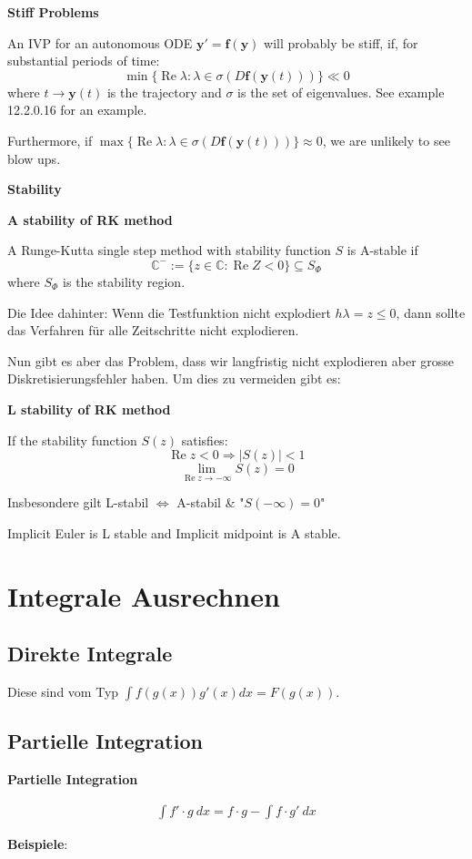 \documentclass{sciposter}
\renewcommand{\vec}[1]{\mathbf{#1}}
\newenvironment{method}[1]{\begin{mdframed}[backgroundcolor=blue!10,innertopmargin=15pt, innerbottommargin=15pt, nobreak=true]
		\textbf{#1 }
	}
	{ 
	\end{mdframed}
}
\newcommand{\psection}[1]{\par \textbf{\large#1}}
\begin{document}
\begin{multicols}{2}
\begin{method}{Stiff Problems}
	An IVP for an autonomous ODE $\vec{y'} = \vec{f}(\vec{y})$ will probably be stiff, if, for substantial periods of time:
	$$\min\{\operatorname{Re} \lambda : \lambda \in \sigma (D\vec{f}(\vec{y}(t)))\} \ll 0$$
	where $t\to \vec{y}(t)$ is the trajectory and $\sigma$ is the set of eigenvalues. See example 12.2.0.16 for an example.
	
	Furthermore, if $\max\{\operatorname{Re} \lambda : \lambda \in \sigma (D\vec{f}(\vec{y}(t)))\} \approx 0$, we are unlikely to see blow ups.
\end{method}



\psection{Stability}

\begin{method}{A stability of RK method}
	A Runge-Kutta single step method with stability function $S$ is A-stable if
	$$\mathbb{C}^- := \{z \in \mathbb{C} : \operatorname{Re} Z < 0\} \subseteq S_\Phi$$
	where $S_\Phi$ is the stability region.
	
	Die Idee dahinter: Wenn die Testfunktion nicht explodiert $h\lambda = z \leq 0$, dann sollte das Verfahren für alle Zeitschritte nicht explodieren.
\end{method}

Nun gibt es aber das Problem, dass wir langfristig nicht explodieren aber grosse Diskretisierungsfehler haben. Um dies zu vermeiden gibt es:

\begin{method}{L stability of RK method}
	If the stability function $S(z)$ satisfies:
	$$\operatorname{Re} z < 0 \Rightarrow |S(z)| < 1$$
	$$\lim\limits_{\operatorname{Re}z \to - \infty} S(z) = 0$$
	
	Insbesondere gilt L-stabil $\iff$ A-stabil \& "$S(-\infty) = 0$"
\end{method}

Implicit Euler is L stable and Implicit midpoint is A stable.

\section*{Integrale Ausrechnen}


\subsection*{Direkte Integrale}
Diese sind vom Typ $\int f(g(x)) g'(x) dx = F(g(x))$.

\subsection*{Partielle Integration}
\begin{method}{Partielle Integration}
	\begin{align*}
	\int f' \cdot g \ dx = f \cdot g - \int f \cdot g' \  dx
	\end{align*}
\end{method}
\textbf{Beispiele}:



\end{multicols}
\end{document}
